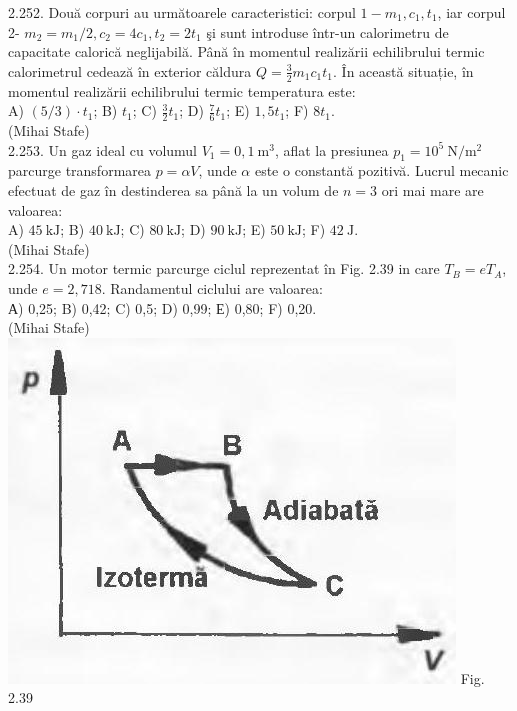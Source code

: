 \documentclass[10pt]{article}
\begin{document}
2.252. Două corpuri au următoarele caracteristici: corpul $1-m_{1}, c_{1}, t_{1}$, iar corpul 2- $m_{2}=m_{1} / 2, c_{2}=4 c_{1}, t_{2}=2 t_{1}$ şi sunt introduse într-un calorimetru de capacitate calorică neglijabilă. Până în momentul realizării echilibrului termic calorimetrul cedează în exterior căldura $Q=\frac{3}{2} m_{1} c_{1} t_{1}$. În această situație, în momentul realizării echilibrului termic temperatura este:\\ A) $(5 / 3) \cdot t_{1}$; B) $t_{1}$; C) $\frac{3}{2} t_{1}$; D) $\frac{7}{6} t_{1}$; E) $1,5 t_{1}$; F) $8 t_{1}$.\\ (Mihai Stafe)\\

2.253. Un gaz ideal cu volumul $V_{1}=0,1 \mathrm{~m}^{3}$, aflat la presiunea $p_{1}=10^{5} \mathrm{~N} / \mathrm{m}^{2}$ parcurge transformarea $p=\alpha V$, unde $\alpha$ este o constantă pozitivă. Lucrul mecanic efectuat de gaz în destinderea sa până la un volum de $n=3$ ori mai mare are valoarea:\\ A) $45 \mathrm{~kJ}$; B) $40 \mathrm{~kJ}$; C) $80 \mathrm{~kJ}$; D) $90 \mathrm{~kJ}$; E) $50 \mathrm{~kJ}$; F) $42 \mathrm{~J}$.\\ (Mihai Stafe)\\

2.254. Un motor termic parcurge ciclul reprezentat în Fig. 2.39 in care $T_{B}=e T_{A}$, unde $e=2,718$. Randamentul ciclului are valoarea:\\ А) 0,25; B) 0,42; C) 0,5; D) 0,99; Е) 0,80; F) 0,20.\\ (Mihai Stafe)\\ \includegraphics[max width=\textwidth, center]{2025_07_01_5b3ff9fa0d508c8e9f17g-131(1)} Fig. 2.39\\
\end{document}
